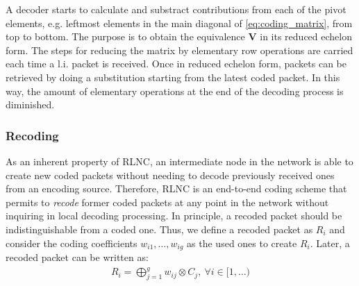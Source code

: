 A decoder starts to calculate and substract contributions from each
of the pivot elements, e.g. leftmost elements in the main diagonal of
\eqref{eq:coding_matrix}, from top to bottom. The purpose is to obtain
the equivalence  $\textbf{V}$ in its reduced echelon form. The steps
for reducing the matrix by elementary row operations are carried each time
a \ac{l.i.} packet is received. Once in reduced echelon form, packets
can be retrieved by doing a substitution starting from the latest
coded packet. In this way, the amount of elementary operations at the end
of the decoding process is diminished.

\subsubsection{Recoding}
As an inherent property of \ac{RLNC}, an intermediate node in the network
is able to create new coded packets without needing to decode previously
received ones from an encoding source. Therefore, \ac{RLNC} is an end-to-end
coding scheme that permits to \textit{recode} former coded packets at any
point in the network without inquiring in local decoding processing. In
principle, a recoded packet should be indistinguishable from a coded one.
Thus, we define a recoded packet as $R_i$ and consider the coding
coefficients $w_{i1}, \ldots, w_{ig}$ as the used ones to
create $R_i$. Later, a recoded packet can be written as:
%
\begin{align}
\label{eq:recoded_packet}
R_i = \bigoplus_{j=1}^{g} w_{ij} \otimes C_j  ,\ \forall i \in [1,\ldots)
\end{align}

